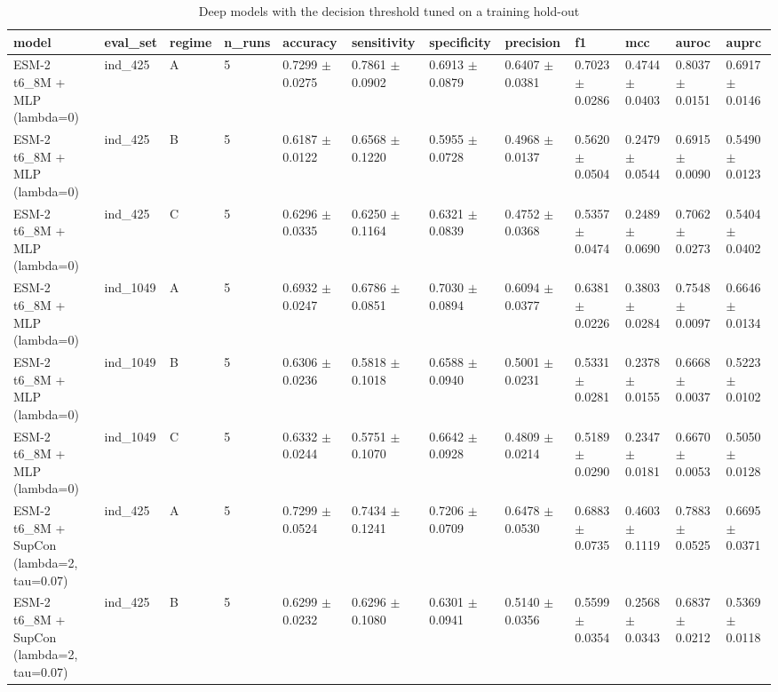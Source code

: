 \begin{table}[ht]
\centering\small
\caption{Deep models with the decision threshold tuned on a training hold-out}
\label{tab:T5_2b_deep_tuned_threshold}
\begin{tabular}{llllllllllll}
\hline
model & eval\_set & regime & n\_runs & accuracy & sensitivity & specificity & precision & f1 & mcc & auroc & auprc \\
\hline
ESM-2 t6\_8M + MLP (lambda=0) & ind\_425 & A & 5 & 0.7299 $\pm$ 0.0275 & 0.7861 $\pm$ 0.0902 & 0.6913 $\pm$ 0.0879 & 0.6407 $\pm$ 0.0381 & 0.7023 $\pm$ 0.0286 & 0.4744 $\pm$ 0.0403 & 0.8037 $\pm$ 0.0151 & 0.6917 $\pm$ 0.0146 \\
ESM-2 t6\_8M + MLP (lambda=0) & ind\_425 & B & 5 & 0.6187 $\pm$ 0.0122 & 0.6568 $\pm$ 0.1220 & 0.5955 $\pm$ 0.0728 & 0.4968 $\pm$ 0.0137 & 0.5620 $\pm$ 0.0504 & 0.2479 $\pm$ 0.0544 & 0.6915 $\pm$ 0.0090 & 0.5490 $\pm$ 0.0123 \\
ESM-2 t6\_8M + MLP (lambda=0) & ind\_425 & C & 5 & 0.6296 $\pm$ 0.0335 & 0.6250 $\pm$ 0.1164 & 0.6321 $\pm$ 0.0839 & 0.4752 $\pm$ 0.0368 & 0.5357 $\pm$ 0.0474 & 0.2489 $\pm$ 0.0690 & 0.7062 $\pm$ 0.0273 & 0.5404 $\pm$ 0.0402 \\
ESM-2 t6\_8M + MLP (lambda=0) & ind\_1049 & A & 5 & 0.6932 $\pm$ 0.0247 & 0.6786 $\pm$ 0.0851 & 0.7030 $\pm$ 0.0894 & 0.6094 $\pm$ 0.0377 & 0.6381 $\pm$ 0.0226 & 0.3803 $\pm$ 0.0284 & 0.7548 $\pm$ 0.0097 & 0.6646 $\pm$ 0.0134 \\
ESM-2 t6\_8M + MLP (lambda=0) & ind\_1049 & B & 5 & 0.6306 $\pm$ 0.0236 & 0.5818 $\pm$ 0.1018 & 0.6588 $\pm$ 0.0940 & 0.5001 $\pm$ 0.0231 & 0.5331 $\pm$ 0.0281 & 0.2378 $\pm$ 0.0155 & 0.6668 $\pm$ 0.0037 & 0.5223 $\pm$ 0.0102 \\
ESM-2 t6\_8M + MLP (lambda=0) & ind\_1049 & C & 5 & 0.6332 $\pm$ 0.0244 & 0.5751 $\pm$ 0.1070 & 0.6642 $\pm$ 0.0928 & 0.4809 $\pm$ 0.0214 & 0.5189 $\pm$ 0.0290 & 0.2347 $\pm$ 0.0181 & 0.6670 $\pm$ 0.0053 & 0.5050 $\pm$ 0.0128 \\
ESM-2 t6\_8M + SupCon (lambda=2, tau=0.07) & ind\_425 & A & 5 & 0.7299 $\pm$ 0.0524 & 0.7434 $\pm$ 0.1241 & 0.7206 $\pm$ 0.0709 & 0.6478 $\pm$ 0.0530 & 0.6883 $\pm$ 0.0735 & 0.4603 $\pm$ 0.1119 & 0.7883 $\pm$ 0.0525 & 0.6695 $\pm$ 0.0371 \\
ESM-2 t6\_8M + SupCon (lambda=2, tau=0.07) & ind\_425 & B & 5 & 0.6299 $\pm$ 0.0232 & 0.6296 $\pm$ 0.1080 & 0.6301 $\pm$ 0.0941 & 0.5140 $\pm$ 0.0356 & 0.5599 $\pm$ 0.0354 & 0.2568 $\pm$ 0.0343 & 0.6837 $\pm$ 0.0212 & 0.5369 $\pm$ 0.0118 \\

\end{tabular}
\end{table}
